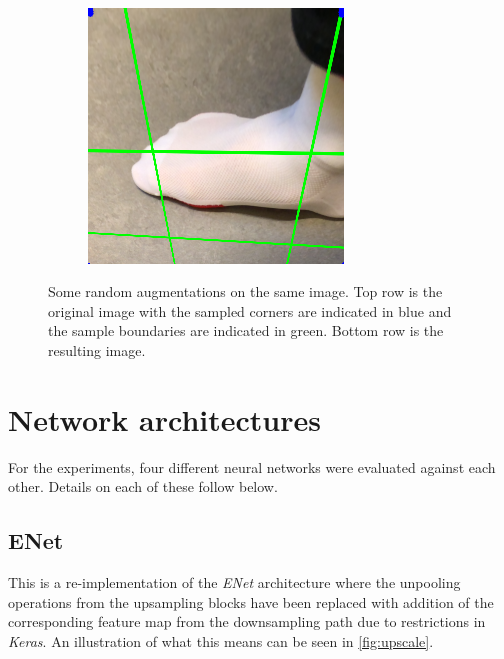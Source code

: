 \documentclass{kththesis}
\begin{document}
\begin{figure}[h]
\begin{subfigure}[b]{0.3\textwidth}
      \end{subfigure}
    ~
    \begin{subfigure}[b]{0.3\textwidth}
        \includegraphics[width=\textwidth]{augmented3}
      \end{subfigure}
      \caption{Some random augmentations on the same image. Top row is the
        original image with the sampled corners are indicated in blue and the sample boundaries are indicated in green. Bottom row is the
        resulting image.}\label{fig:augment}
\end{figure}


\section{Network architectures}
For the experiments, four different neural networks were evaluated against each
other. Details on each of these follow below. 

\subsection*{ENet}
This is a re-implementation of the \textit{ENet} architecture
\parencite{paszke2016enet} where the unpooling operations from the upsampling
blocks have been replaced with addition of the corresponding feature map from the
downsampling path due to restrictions in \textit{Keras}. An illustration of what
this means can be seen in \cref{fig:upscale}.
\end{document}
